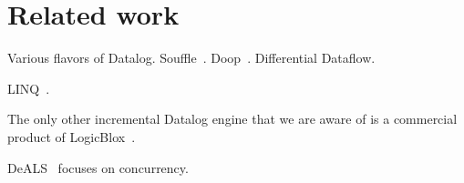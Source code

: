\section{Related work}

Various flavors of Datalog.  Souffle~\cite{scholz-cc16}.
Doop~\cite{Bravenboer-oopsla09}.  Differential Dataflow.

LINQ~\cite{meijer-dpcool03,Meijer-sigmod06}.

The only other incremental Datalog engine that we are aware of is a
commercial product of LogicBlox~\cite{Aref-sigmod15}.

DeALS~\cite{Yang-vldb17} focuses on concurrency.


